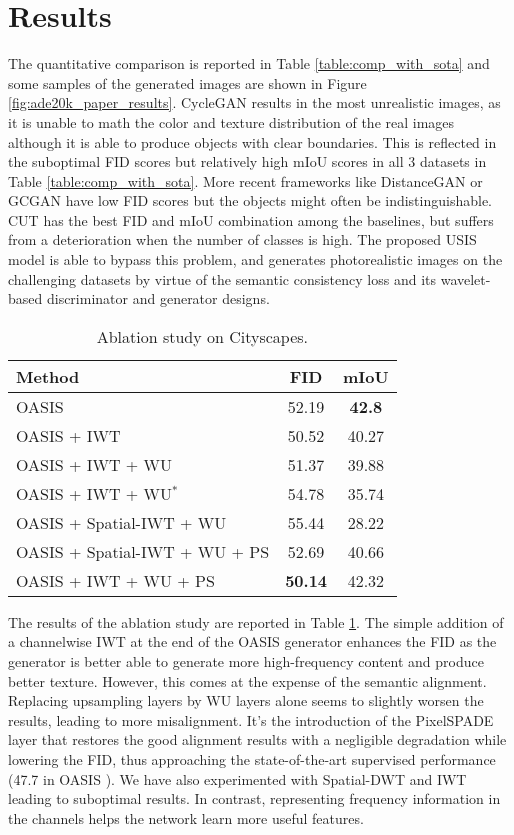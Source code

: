 \documentclass{article}
\begin{document}
 \vspace{-1.7em}
\section{Results}
\label{sec:results}
\vspace{-1em}
The quantitative comparison is reported in Table \ref{table:comp_with_sota} and some samples of the generated images are shown in Figure \ref{fig:ade20k_paper_results}. CycleGAN results in the most unrealistic images, as it is unable to math the color and texture distribution of the real images although it is able to produce objects with clear boundaries. This is reflected in the suboptimal FID scores but relatively high mIoU scores in all 3 datasets in Table \ref{table:comp_with_sota}. More recent frameworks like DistanceGAN or GCGAN have low FID scores but the objects might often be indistinguishable. CUT has the best FID and mIoU combination among the baselines, but suffers from a deterioration when the number of classes is high. The proposed USIS model is able to bypass this problem, and generates photorealistic images on the challenging datasets by virtue of the semantic consistency loss and its wavelet-based discriminator and generator designs.    
\begin{table}[h]
    \begin{tabular}{l|cc}
         Method & FID & mIoU  \\ 
         \hline
         OASIS                         & 52.19 & \textbf{42.8}  \\
         OASIS + IWT                   & 50.52 & 40.27 \\
         OASIS + IWT + WU              & 51.37 & 39.88 \\
         OASIS + IWT + WU$^{*}$        & 54.78 & 35.74 \\
         OASIS + Spatial-IWT + WU      & 55.44 & 28.22 \\
         OASIS + Spatial-IWT + WU + PS & 52.69 & 40.66 \\
         OASIS + IWT + WU + PS         & \textbf{50.14} & 42.32 \\
         
    \end{tabular}
\caption{Ablation study on Cityscapes.}
\label{tab:ablation}
\vspace{-1.5em}
\end{table} 
The results of the ablation study are reported in Table \ref{tab:ablation}. The simple addition of a channelwise IWT at the end of the OASIS generator enhances the FID as the generator is better able to generate more high-frequency content and produce better texture. However, this comes at the expense of the semantic alignment. Replacing upsampling layers by WU layers alone seems to slightly worsen the results, leading to more misalignment. It's the introduction of the PixelSPADE layer that restores the good alignment results with a negligible degradation while lowering the FID, thus approaching the state-of-the-art supervised performance (47.7 in OASIS \cite{schonfeld2021you}). We have also experimented with Spatial-DWT and IWT leading to suboptimal results. In contrast, representing frequency information in the channels helps the network learn more useful features.    
\end{document}
